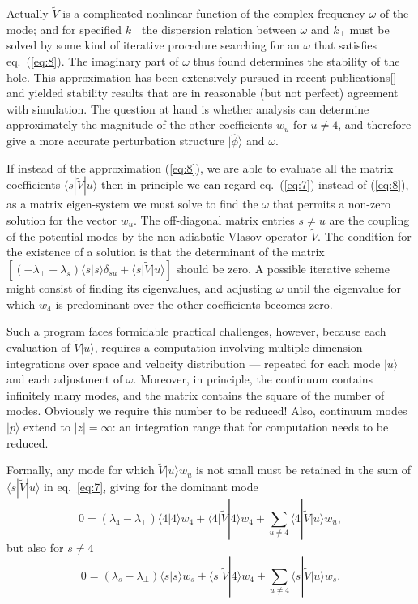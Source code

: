 \documentclass[12pt]{article}
\def\ket#1{|#1\rangle}
\def\bra#1{\langle#1}
\begin{document}
Actually $\tilde{V}$ is a complicated nonlinear function of the complex
frequency $\omega$ of the mode; and for specified $k_\perp$ the
dispersion relation between $\omega$ and $k_\perp$ must be solved by
some kind of iterative procedure searching for an $\omega$ that
satisfies eq.\ (\ref{eq:8}). The imaginary part of $\omega$ thus found
determines the stability of the hole. This approximation has been
extensively pursued in recent publications[] and yielded stability results
that are in reasonable (but not perfect) agreement with simulation.
The question at hand is whether analysis can determine approximately
the magnitude of the other coefficients $w_u$ for $u\not=4$, and
therefore give a more accurate perturbation structure $\ket{\hat\phi}$
and $\omega$.

If instead of the approximation (\ref{eq:8}), we are able to evaluate all the
matrix coefficients $\bra{s}|\tilde{V}\ket{u}$ then in principle we can regard eq.\
(\ref{eq:7}) instead of (\ref{eq:8}), as a matrix eigen-system we must
solve to find the $\omega$ that permits a non-zero solution for the
vector $w_u$. The off-diagonal matrix entries $s\not=u$ are the
coupling of the potential modes by the non-adiabatic Vlasov operator
$\tilde{V}$.  The condition for the existence of a solution is that the
determinant of the matrix
$[(-\lambda_\perp+\lambda_s)\bra{s}\ket{s}\delta_{su}+\bra{s}|\tilde{V}\ket{u}]$ should
be zero. A possible iterative scheme might consist of finding its
eigenvalues, and adjusting $\omega$ until the eigenvalue for which
$w_4$ is predominant over the other coefficients becomes zero.

Such a program faces formidable practical challenges, however, because
each evaluation of $\tilde{V}\ket{u}$, requires a computation involving
multiple-dimension integrations over space and velocity distribution
--- repeated for each mode $\ket{u}$ and each adjustment of $\omega$.
Moreover, in principle, the continuum contains infinitely many modes,
and the matrix contains the square of the number of modes.  Obviously
we require this number to be reduced! Also, continuum modes $\ket{p}$
extend to $|z|=\infty$: an integration range that for computation
needs to be reduced.

Formally, any mode for which $\tilde{V}\ket{u}w_u$ is not small
must be retained in the sum of $\bra{s}|\tilde{V}\ket{u}$ in eq.\
\ref{eq:7}, giving for the dominant mode
\begin{equation}
  \label{eq:9}
  0=(\lambda_4-\lambda_\perp)\bra{4}\ket{4}w_4+\bra{4}|\tilde{V}\ket{4}w_4+\sum_{u\not=4}\bra{4}|\tilde{V}\ket{u}w_u,
\end{equation}
but also for $s\not=4$
\begin{equation}
  \label{eq:10}
 0=(\lambda_s-\lambda_\perp)\bra{s}\ket{s}w_s+\bra{s}|\tilde{V}\ket{4}w_4+\sum_{u\not=4}\bra{s}|\tilde{V}\ket{u}w_s.
\end{equation}
\end{document}
